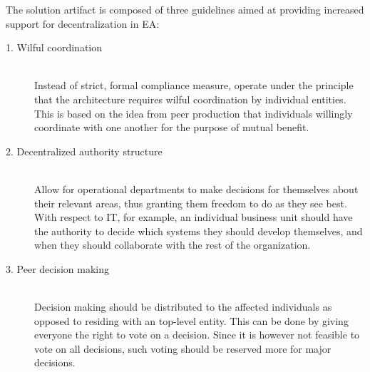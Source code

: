 The solution artifact is composed of three guidelines aimed at providing increased support for decentralization in EA:

\begin{description}
\item[1. Wilful coordination] \hfill \\ Instead of strict, formal compliance measure, operate under the principle that the architecture requires wilful coordination by individual entities. This is based on the idea from peer production that individuals willingly coordinate with one another for the purpose of mutual benefit.

\item[2. Decentralized authority structure] \hfill \\ Allow for operational departments to make decisions for themselves about their relevant areas, thus granting them freedom to do as they see best. With respect to IT, for example, an individual business unit should have the authority to decide which systems they should develop themselves, and when they should collaborate with the rest of the organization. 

\item[3. Peer decision making] \hfill \\ Decision making should be distributed to the affected individuals as opposed to residing with an top-level entity. This can be done by giving everyone the right to vote on a decision. Since it is however not feasible to vote on all decisions, such voting should be reserved more for major decisions. 
\end{description}